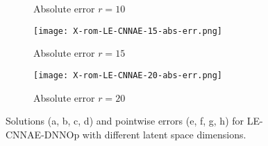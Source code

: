 \begin{figure}[!htb]
\begin{center}
\begin{subfigure}[b]{0.23\textwidth}
             \caption{Absolute error $r = 10$}
         \end{subfigure}   
         \begin{subfigure}[b]{0.23\textwidth}
             \begin{center}
                \texttt{[image: X-rom-LE-CNNAE-15-abs-err.png]}
             \end{center}
             \caption{Absolute error $r = 15$}
         \end{subfigure}    
         \begin{subfigure}[b]{0.23\textwidth}
             \begin{center}
                \texttt{[image: X-rom-LE-CNNAE-20-abs-err.png]}
             \end{center}
             \caption{Absolute error $r = 20$}
         \end{subfigure}
     \end{center}
     \caption[Solutions and pointwise errors for LE-CNNAE-DNNOp.]{Solutions (a, b, c, d) and pointwise errors (e, f, g, h) for LE-CNNAE-DNNOp with different latent space dimensions.}
        \label{fig: lecnnae-burger}
\end{figure}

